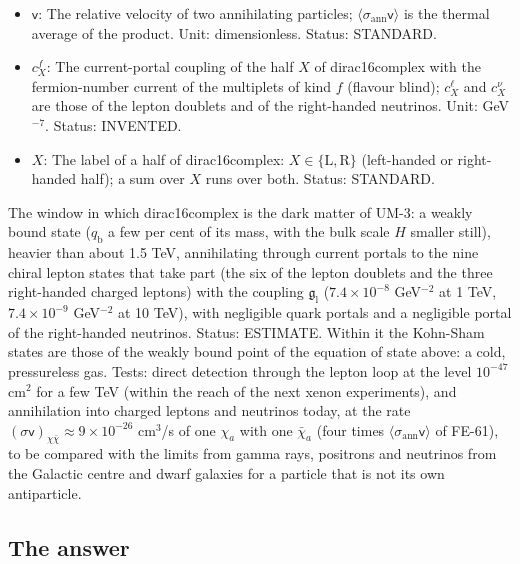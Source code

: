 \documentclass[
  10pt,
]{article}
\begin{document}
\begin{itemize}
  annihilation rate \((\sigma\mathsf{v})_{\chi\bar\chi}\) of one
  particle \(\chi_a\) with one antiparticle \(\bar\chi_a\). Unit:
  GeV\(^{-2}\). Status: DERIVED.
\item
  \(\mathsf{v}\): The relative velocity of two annihilating particles;
  \(\langle\sigma_{\mathrm{ann}}\mathsf{v}\rangle\) is the thermal
  average of the product. Unit: dimensionless. Status: STANDARD.
\item
  \(c^{f}_X\): The current-portal coupling of the half \(X\) of
  dirac16complex with the fermion-number current of the multiplets of
  kind \(f\) (flavour blind); \(c^{\ell}_X\) and \(c^{\nu}_X\) are those
  of the lepton doublets and of the right-handed neutrinos. Unit:
  GeV\(^{-7}\). Status: INVENTED.
\item
  \(X\): The label of a half of dirac16complex:
  \(X \in \{\mathrm{L}, \mathrm{R}\}\) (left-handed or right-handed
  half); a sum over \(X\) runs over both. Status: STANDARD.
\end{itemize}

The window in which dirac16complex is the dark matter of UM-3: a weakly
bound state (\(q_{\mathrm{b}}\) a few per cent of its mass, with the
bulk scale \(H\) smaller still), heavier than about 1.5 TeV,
annihilating through current portals to the nine chiral lepton states
that take part (the six of the lepton doublets and the three
right-handed charged leptons) with the coupling
\(\mathfrak{g}_{\mathrm{l}}\) (\(7.4\times10^{-8}\) GeV\(^{-2}\) at 1
TeV, \(7.4\times10^{-9}\) GeV\(^{-2}\) at 10 TeV), with negligible quark
portals and a negligible portal of the right-handed neutrinos. Status:
ESTIMATE. Within it the Kohn-Sham states are those of the weakly bound
point of the equation of state above: a cold, pressureless gas. Tests:
direct detection through the lepton loop at the level \(10^{-47}\)
cm\(^2\) for a few TeV (within the reach of the next xenon experiments),
and annihilation into charged leptons and neutrinos today, at the rate
\((\sigma\mathsf{v})_{\chi\bar\chi} \approx 9\times10^{-26}\) cm\(^3\)/s
of one \(\chi_a\) with one \(\bar\chi_a\) (four times
\(\langle\sigma_{\mathrm{ann}}\mathsf{v}\rangle\) of FE-61), to be
compared with the limits from gamma rays, positrons and neutrinos from
the Galactic centre and dwarf galaxies for a particle that is not its
own antiparticle.

\hypertarget{the-answer-1}{%
\subsection{The answer}\label{the-answer-1}}
\end{document}
